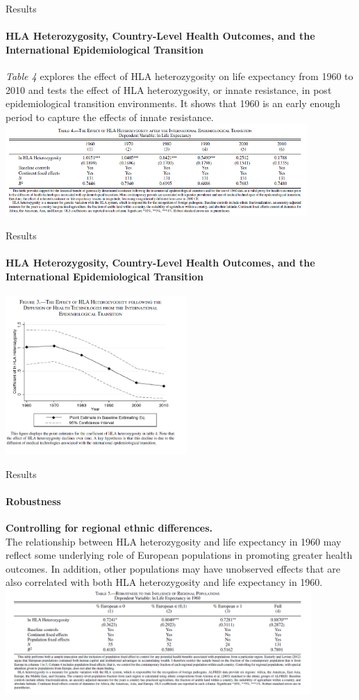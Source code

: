 \documentclass[pdftex,12pt,xcolor=pdftex,table]{beamer}
\theoremstyle{definition}
\theoremstyle{remark}
\numberwithin{equation}{section}
\numberwithin{figure}{section}
\begin{document}
\begin{frame}{Results}
\framesubtitle{HLA Heterozygosity, Country-Level Health Outcomes, and the International Epidemiological Transition}
\justifying
\textit{Table 4} explores the effect of HLA heterozygosity on life expectancy from 1960 to 2010 and tests the effect of HLA heterozygosity, or innate resistance, in post epidemiological transition environments. It shows that 1960 is an early enough period to capture the effects of innate resistance.\\
\includegraphics[height=3.5cm]{Table_4.PNG}
\end{frame}


\begin{frame}{Results}
\framesubtitle{HLA Heterozygosity, Country-Level Health Outcomes, and the International Epidemiological Transition}
\includegraphics[height=6cm]{Figure_3.PNG}
\end{frame}


\begin{frame}{Results}
\framesubtitle{Robustness}
\justifying
\textbf{Controlling for regional ethnic differences.}\\
The relationship between HLA heterozygosity and life expectancy in 1960 may reflect some underlying role of European populations in promoting greater health outcomes. In addition, other populations may have unobserved effects that are also correlated with both HLA heterozygosity and life expectancy in 1960.\\ 
\pause
\includegraphics[height=4cm]{Table_5.PNG}
\end{frame}
\end{document}
